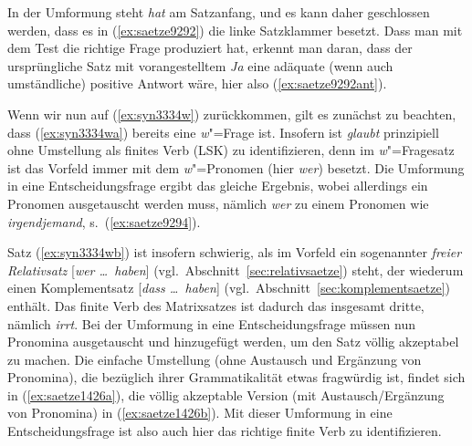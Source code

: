 \begin{exe}
\end{exe}

In der Umformung steht \textit{hat} am Satzanfang, und es kann daher geschlossen werden, dass es in (\ref{ex:saetze9292}) die linke Satzklammer besetzt.
Dass man mit dem Test die richtige Frage produziert hat, erkennt man daran, dass der ursprüngliche Satz mit vorangestelltem \textit{Ja} eine adäquate (wenn auch umständliche) positive Antwort wäre, hier also (\ref{ex:saetze9292ant}).

\begin{exe}
\end{exe}

Wenn wir nun auf (\ref{ex:syn3334w}) zurückkommen, gilt es zunächst zu beachten, dass (\ref{ex:syn3334wa}) bereits eine \textit{w}"=Frage ist.
Insofern ist \textit{glaubt} prinzipiell ohne Umstellung als finites Verb (LSK) zu identifizieren, denn im \textit{w}"=Fragesatz ist das Vorfeld immer mit dem \textit{w}"=Pro\-no\-men (hier \textit{wer}) besetzt.
Die Umformung in eine Entscheidungsfrage ergibt das gleiche Ergebnis, wobei allerdings ein Pronomen ausgetauscht werden muss, nämlich \textit{wer} zu einem Pronomen wie \textit{irgendjemand}, s.\ (\ref{ex:saetze9294}).

\begin{exe}
\end{exe}

Satz (\ref{ex:syn3334wb}) ist insofern schwierig, als im Vorfeld ein sogenannter \textit{freier Relativsatz} [\textit{wer \ldots\ haben}] (vgl.\ Abschnitt~\ref{sec:relativsaetze}) steht, der wiederum einen Komplementsatz [\textit{dass \ldots\ haben}] (vgl.\ Abschnitt~\ref{sec:komplementsaetze}) enthält.
Das finite Verb des Matrixsatzes ist dadurch das insgesamt dritte, nämlich \textit{irrt}.
Bei der Umformung in eine Entscheidungsfrage müssen nun Pronomina ausgetauscht und hinzugefügt werden, um den Satz völlig akzeptabel zu machen.
Die einfache Umstellung (ohne Austausch und Ergänzung von Pronomina), die bezüglich ihrer Grammatikalität etwas fragwürdig ist, findet sich in (\ref{ex:saetze1426a}), die völlig akzeptable Version (mit Austausch\slash Ergänzung von Pronomina) in (\ref{ex:saetze1426b}).
Mit dieser Umformung in eine Entscheidungsfrage ist also auch hier das richtige finite Verb zu identifizieren.

